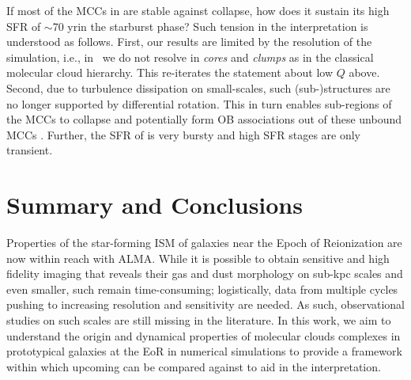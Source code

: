 \IfFileExists{emulateapjlegacy.cls}{\documentclass[iop]{emulateapjlegacy}}{\documentclass[iop]{emulateapj}}
\newcommand{\MM}[1]{({\bf \color{mmcolor} MM: #1})}
\begin{document}
If most of the MCCs in \flower are stable against collapse,
how does it sustain its high SFR of $\sim$70\,\Msun\,yr\pmOne in the starburst phase?
Such tension in the interpretation is understood as follows.
%
First, our results are limited by the resolution of the simulation, i.e., in \flower~we do not resolve \SF in {\it cores} and {\it clumps} as in the classical molecular cloud hierarchy. This re-iterates the statement about low $Q$ above.
%
Second, due to turbulence dissipation on small-scales, such
(sub-)structures are no longer supported by differential rotation.
This in turn enables sub-regions of the MCCs to collapse and potentially form
OB associations out of these unbound MCCs \citep{Clark04a, Clark05a}.
Further, the SFR of \flower is very bursty and high SFR stages are only transient.


\section{Summary and Conclusions}      \label{sec:conclusion}

Properties of the star-forming ISM of galaxies near the Epoch of Reionization are now within reach with ALMA.
While it is possible to obtain sensitive and high fidelity imaging that reveals their gas and dust morphology
on sub-kpc scales and even smaller, such \obs remain time-consuming; logistically, data from multiple cycles pushing to increasing resolution
and sensitivity are needed. As such, observational studies on such scales are still missing in the literature.
In this work, we aim to understand the origin and dynamical properties of molecular clouds complexes
in prototypical galaxies at the EoR in numerical simulations
to provide a framework within which upcoming \obs can be compared against to aid in the interpretation.
\end{document}
